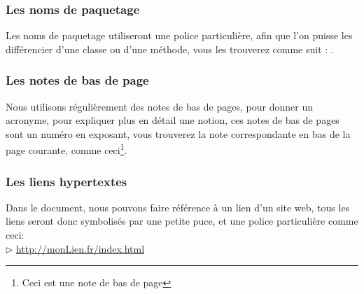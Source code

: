 \subsubsection*{Les noms de paquetage}
Les noms de paquetage utiliseront une police particulière, afin que l'on puisse les différencier d'une classe ou d'une méthode, vous les trouverez 
comme suit : .
\subsubsection*{Les notes de bas de page}
Nous utilisons régulièrement des notes de bas de pages, pour donner un acronyme, pour expliquer plus en détail une notion, ces notes de bas de pages sont un numéro
en exposant, vous trouverez la note correspondante en bas de la page courante, comme ceci\footnote{Ceci est une note de bas de page}.
\subsubsection*{Les liens hypertextes}
Dans le document, nous pouvons faire référence à un lien d'un site web, tous les liens seront donc symbolisés par une petite puce, et une police particulière comme ceci:\\
	$\rhd$ \url{http://monLien.fr/index.html}\\

